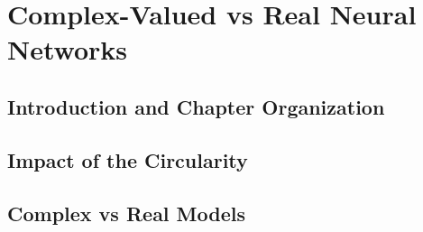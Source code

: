 \documentclass[../main.tex]{subfiles}
\begin{document}
	
\chapter{Complex-Valued vs Real Neural Networks}

\section*{Introduction and Chapter Organization}

\section{Impact of the Circularity}

\section{Complex vs Real Models}
	
	
	
\end{document}
